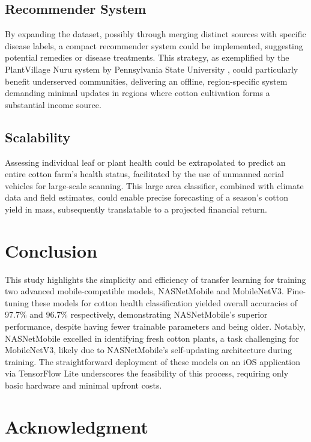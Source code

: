 \documentclass[conference]{IEEEtran}
\begin{document}
\subsection{Recommender System}

By expanding the dataset, possibly through merging distinct sources with specific disease labels, a compact recommender system could be implemented, suggesting potential remedies or disease treatments. This strategy, as exemplified by the PlantVillage Nuru system by Pennsylvania State University \cite{PlantVillage}, could particularly benefit underserved communities, delivering an offline, region-specific system demanding minimal updates in regions where cotton cultivation forms a substantial income source.

\subsection{Scalability}

Assessing individual leaf or plant health could be extrapolated to predict an entire cotton farm's health status, facilitated by the use of unmanned aerial vehicles for large-scale scanning. This large area classifier, combined with climate data and field estimates, could enable precise forecasting of a season's cotton yield in mass, subsequently translatable to a projected financial return.

\section{Conclusion}

This study highlights the simplicity and efficiency of transfer learning for training two advanced mobile-compatible models, NASNetMobile and MobileNetV3. Fine-tuning these models for cotton health classification yielded overall accuracies of 97.7\% and 96.7\% respectively, demonstrating NASNetMobile's superior performance, despite having fewer trainable parameters and being older. Notably, NASNetMobile excelled in identifying fresh cotton plants, a task challenging for MobileNetV3, likely due to NASNetMobile's self-updating architecture during training. The straightforward deployment of these models on an iOS application via TensorFlow Lite underscores the feasibility of this process, requiring only basic hardware and minimal upfront costs.

\section{Acknowledgment}
\end{document}

